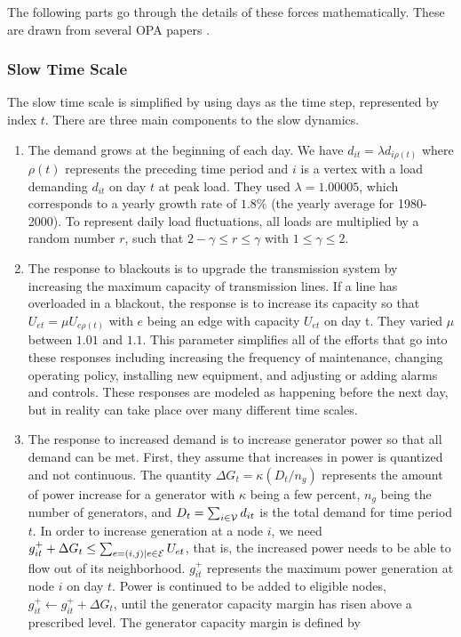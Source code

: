 The following parts go through the details of these forces mathematically.  These are drawn from several OPA papers \cite{dobson_2001,carreras_2004,dobson_2007}.  

\subsubsection{Slow Time Scale}
The slow time scale is simplified by using days as the time step, represented by index $t$.  There are three main components to the slow dynamics.
\begin{enumerate}
\item The demand grows at the beginning of each day.  We have $d_{it} = \lambda d_{i \rho(t)}$ where $\rho(t)$ represents the preceding time period and $i$ is a vertex with a load demanding $d_{it}$ on day $t$ at peak load.  They used $\lambda = 1.00005$, which corresponds to a yearly growth rate of $1.8\%$ (the yearly average for 1980-2000).  To represent daily load fluctuations, all loads are multiplied by a random number $r$, such that $2-\gamma \le r \le \gamma$ with $1 \le \gamma \le 2$.
\item The response to blackouts is to upgrade the transmission system by increasing the maximum capacity of transmission lines.  If a line has overloaded in a blackout, the response is to increase its capacity so that $U_{et} = \mu U_{e \rho(t)}$ with $e$ being an edge with capacity $U_{et}$ on day t.  They varied $\mu$ between $1.01$ and  $1.1$.  This parameter simplifies all of the efforts that go into these responses including increasing the frequency of maintenance, changing operating policy, installing new equipment, and adjusting or adding alarms and controls.  These responses are modeled as happening before the next day, but in reality can take place over many different time scales.
\item The response to increased demand is to increase generator power so that all demand can be met.  First, they assume that increases in power is quantized and not continuous.  The quantity $\Delta G_t = \kappa ( D_t / n_g )$ represents the amount of power increase for a generator with $\kappa$ being a few percent, $n_g$ being the number of generators, and $D_t = \sum_{i \in \mathcal{V}} d_{it}$ is the total demand for time period $t$.  In order to increase generation at a node $i$, we need $g_{it}^+ + \Delta G_t \le \sum_{e=(i,j) | e \in \mathcal{E}} U_{et}$, that is, the increased power needs to be able to flow out of its neighborhood.  $g_{it}^+$ represents the maximum power generation at node $i$ on day $t$.  Power is continued to be added to eligible nodes, $g_{it}^+ \leftarrow g_{it}^ + + \Delta G_t$, until the generator capacity margin has risen above a prescribed level.  The generator capacity margin is defined by

\end{enumerate}
